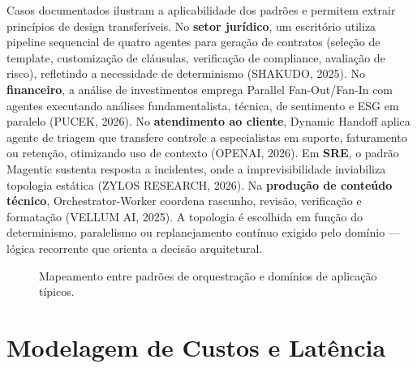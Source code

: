 \documentclass[12pt,a4paper]{article}
\begin{document}
Casos documentados ilustram a aplicabilidade dos padrões e permitem extrair princípios de design transferíveis. No \textbf{setor jurídico}, um escritório utiliza pipeline sequencial de quatro agentes para geração de contratos (seleção de template, customização de cláusulas, verificação de compliance, avaliação de risco), refletindo a necessidade de determinismo (SHAKUDO, 2025). No \textbf{financeiro}, a análise de investimentos emprega Parallel Fan-Out/Fan-In com agentes executando análises fundamentalista, técnica, de sentimento e ESG em paralelo (PUCEK, 2026). No \textbf{atendimento ao cliente}, Dynamic Handoff aplica agente de triagem que transfere controle a especialistas em suporte, faturamento ou retenção, otimizando uso de contexto (OPENAI, 2026). Em \textbf{SRE}, o padrão Magentic sustenta resposta a incidentes, onde a imprevisibilidade inviabiliza topologia estática (ZYLOS RESEARCH, 2026). Na \textbf{produção de conteúdo técnico}, Orchestrator-Worker coordena rascunho, revisão, verificação e formatação (VELLUM AI, 2025). A topologia é escolhida em função do determinismo, paralelismo ou replanejamento contínuo exigido pelo domínio — lógica recorrente que orienta a decisão arquitetural.
\begin{figure}[htbp]
\centering
{}
\caption{Mapeamento entre padrões de orquestração e domínios de aplicação típicos.}
\end{figure}


\section{Modelagem de Custos e Latência}
\end{document}
